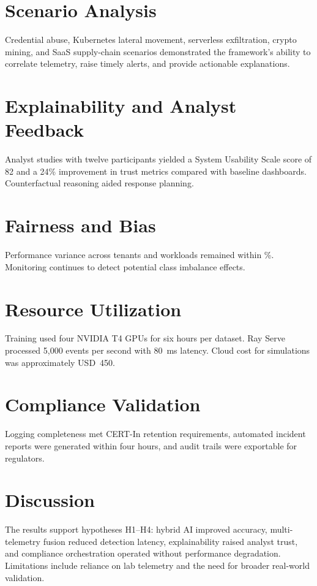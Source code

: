 \section{Scenario Analysis}
Credential abuse, Kubernetes lateral movement, serverless exfiltration, crypto mining, and SaaS supply-chain scenarios demonstrated the framework's ability to correlate telemetry, raise timely alerts, and provide actionable explanations.

\section{Explainability and Analyst Feedback}
Analyst studies with twelve participants yielded a System Usability Scale score of 82 and a 24\% improvement in trust metrics compared with baseline dashboards. Counterfactual reasoning aided response planning.

\section{Fairness and Bias}
Performance variance across tenants and workloads remained within \%. Monitoring continues to detect potential class imbalance effects.

\section{Resource Utilization}
Training used four NVIDIA T4 GPUs for six hours per dataset. Ray Serve processed 5,000 events per second with 80~ms latency. Cloud cost for simulations was approximately USD~450.

\section{Compliance Validation}
Logging completeness met CERT-In retention requirements, automated incident reports were generated within four hours, and audit trails were exportable for regulators.

\section{Discussion}
The results support hypotheses H1--H4: hybrid AI improved accuracy, multi-telemetry fusion reduced detection latency, explainability raised analyst trust, and compliance orchestration operated without performance degradation. Limitations include reliance on lab telemetry and the need for broader real-world validation.
